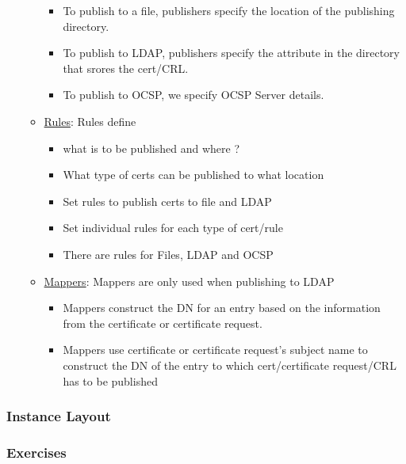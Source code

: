 \documentclass[a4paper]{article}
\begin{document}
\begin{itemize}
\begin{itemize}
\begin{itemize}
                            \item To publish to a file, publishers specify the location of the publishing directory.
                            \item To publish to LDAP, publishers specify the attribute in the directory that srores the cert/CRL.
                            \item To publish to OCSP, we specify OCSP Server details. 
                        \end{itemize}
                    \item \underline{Rules}: Rules define 
                        \begin{itemize}
                            \item what is to be published and where ?
                            \item What type of certs can be published to what location
                            \item Set rules to publish certs to file and LDAP
                            \item Set individual rules for each type of cert/rule
                            \item There are rules for Files, LDAP and OCSP
                        \end{itemize}
                    \item \underline{Mappers}: Mappers are only used when publishing to LDAP
                        \begin{itemize}
                            \item Mappers construct the DN for an entry based on the information
                                from the certificate or certificate request. 
                            \item Mappers use certificate or certificate request's subject name to
                                construct the DN of the entry to which cert/certificate request/CRL has to be published
                        \end{itemize}
            \end{itemize}
    \end{itemize}
\subsubsection{Instance Layout}
\subsubsection{Exercises}
\end{document}
